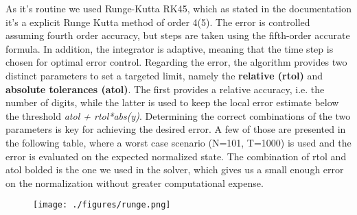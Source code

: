 \documentclass[aps,pra,reprint, onecolumn]{revtex4-2}
\newcommand\setrow[1]{\gdef\rowmac{#1}#1\ignorespaces}
\newcommand\clearrow{\global\let\rowmac\relax}
\begin{document}
As it's routine we used Runge-Kutta RK45, which as stated in the documentation it's a explicit Runge Kutta method of order 4(5). The error is controlled assuming fourth order accuracy, but steps are taken using the fifth-order accurate formula. In addition, the integrator is adaptive, meaning that the time step is chosen for optimal error control. Regarding the error, the algorithm provides two distinct parameters to set a targeted limit, namely the \textbf{relative (rtol)} and \textbf{absolute tolerances (atol)}. The first provides a relative accuracy, i.e. the number of digits, while the latter is used to keep the local error estimate below the threshold \textit{atol + rtol*abs(y)}. Determining the correct combinations of the two parameters is key for achieving the desired error. A few of those are presented in the following table, where a worst case scenario (N=101, T=1000) is used and the error is evaluated on the expected normalized state. The combination of rtol and atol bolded is the one we used in the solver, which gives us a small enough error on the normalization without greater computational expense.\\

\begin{figure}[ht]
\texttt{[image: ./figures/runge.png]}%
\end{figure}

\clearpage




\end{document}
